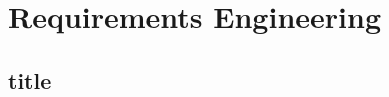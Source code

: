 \documentclass[a4paper]{article}
\begin{document}
\newpage
				
	\section{Requirements Engineering}
	
		\subsection{title}
		
		
		
		
		
	
	
\end{document}
